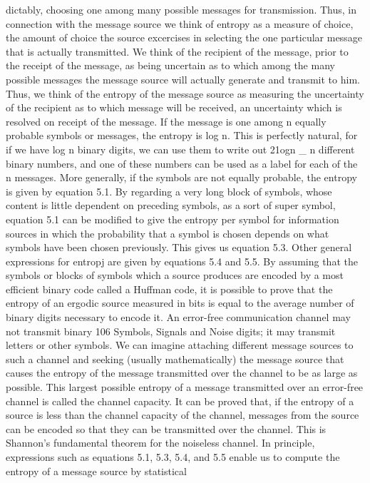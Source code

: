 {{{dictably, choosing one among many possible messages for transmission.
Thus, in connection with the message source we think of
entropy as a measure of choice, the amount of choice the source
excercises in selecting the one particular message that is actually
transmitted.
We think of the recipient of the message, prior to the receipt of
the message, as being uncertain as to which among the many
possible messages the message source will actually generate and
transmit to him. Thus, we think of the entropy of the message
source as measuring the uncertainty of the recipient as to which
message will be received, an uncertainty which is resolved on
receipt of the message.
If the message is one among n equally probable symbols or
messages, the entropy is log n. This is perfectly natural, for if we
have log n binary digits, we can use them to write out
21ogn _ n
different binary numbers, and one of these numbers can be used
as a label for each of the n messages.
More generally, if the symbols are not equally probable, the
entropy is given by equation 5.1. By regarding a very long block
of symbols, whose content is little dependent on preceding symbols,
as a sort of super symbol, equation 5.1 can be modified to give the
entropy per symbol for information sources in which the probability
that a symbol is chosen depends on what symbols have been
chosen previously. This gives us equation 5.3. Other general
expressions for entropj are given by equations 5.4 and 5.5.
By assuming that the symbols or blocks of symbols which a
source produces are encoded by a most efficient binary code called
a Huffman code, it is possible to prove that the entropy of an
ergodic source measured in bits is equal to the average number of
binary digits necessary to encode it.
An error-free communication channel may not transmit binary
106
Symbols, Signals and Noise
digits; it may transmit letters or other symbols. We can imagine
attaching different message sources to such a channel and seeking
(usually mathematically) the message source that causes the entropy
of the message transmitted over the channel to be as large
as possible. This largest possible entropy of a message transmitted
over an error-free channel is called the channel capacity. It can be
proved that, if the entropy of a source is less than the channel
capacity of the channel, messages from the source can be encoded
so that they can be transmitted over the channel. This is Shannon’s
fundamental theorem for the noiseless channel.
In principle, expressions such as equations 5.1, 5.3, 5.4, and 5.5
enable us to compute the entropy of a message source by statistical
}}}
